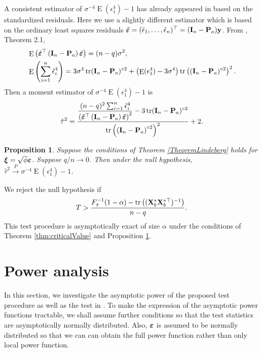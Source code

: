 \documentclass[11pt]{article}
\DeclareMathOperator{\mytr}{tr}
\DeclareMathOperator{\myE}{E}
\newcommand{\By}{\mathbf{y}}    \newcommand{\Bz}{\mathbf{z}}
\newcommand{\bfsym}[1]{\ensuremath{\boldsymbol{#1}}}
\def\bxi{\bfsym {\xi}}
\theoremstyle{plain}
\newtheorem{proposition}{\quad\quad Proposition}
\theoremstyle{definition}
\theoremstyle{remark}
\begin{document}
        A consistent estimator of $\sigma^{-4} \myE (\epsilon_1^4)-1$ has already appeared in \cite{Bai2017} based on the standardized residuals.
        Here we use a slightly different estimator which is based on the ordinary least squares residuals $\tilde \bepsilon=(\tilde \epsilon_1,\ldots, \tilde \epsilon_n)^\top=(\BI_n - \BP_a) \By$.
    From \cite{Bai2017}, Theorem 2.1, 
    \begin{align*}
        &\myE \left( \tilde \bepsilon^\top \left( \BI_n-\BP_a \right) \tilde \bepsilon \right)
        = (n-q) \sigma^2,
        \\
        &\myE \left( \sum_{i=1}^n \tilde \epsilon_i^4 \right)
        =
        3\sigma^4 \mytr (\BI_n-\BP_a)^{\circ 2} 
        +\left( \myE (\epsilon_1^4)-3 \sigma^{4}\right)
        \mytr \left( (\BI_n-\BP_a)^{\circ 2}  \right)^2.
    \end{align*}
    Then a moment estimator of $\sigma^{-4}\myE (\epsilon_1^4)-1$ is 
\begin{equation*}
    \hat \tau^2 =
    \frac{
        \displaystyle\frac{(n-q)^2 \sum_{i=1}^n \tilde{\epsilon}_i^4}{\left( \tilde \bepsilon^\top \left( \BI_n - \BP_a \right) \tilde \bepsilon \right)^2}
        - 3\mytr (\BI_n-\BP_a)^{\circ 2}
    }{
        \mytr\left( \left( \BI_n-\BP_a \right)^{\circ 2} \right)^2
    }
    +2.
\end{equation*}

\begin{proposition}\label{prop:estimation}
    Suppose the conditions of Theorem \ref{TheoremLindeberg} holds for $\bxi=\sqrt \phi \bepsilon$.
    Suppose $q/n\to 0$.
    Then under the null hypothesis, $\hat \tau^2 \xrightarrow{P} \sigma^{-4} \myE (\epsilon_1^4)-1$.
\end{proposition}
We reject the null hypothesis if 
\begin{equation*}
    T > \frac{F^{-1}_{\hat \tau} (1-\alpha)-\mytr\left( (\BX_b^* \BX_b^{*\top})^{-1}  \right)}{n-q}.
\end{equation*}
This test procedure is asymptotically exact of size $\alpha$ under the conditions of Theorem \ref{thm:criticalValue} and Proposition \ref{prop:estimation}.


\section{Power analysis}
In this section, we investigate the asymptotic power of the proposed test procedure as well as the test in \cite{Goeman2006}.
To make the expression of the asymptotic power functions tractable, we shall assume further conditions so that the test statistics are asymptotically normally distributed.
Also, $\bepsilon$ is assumed to be normally distributed so that we can can obtain the full power function rather than only local power function.
\end{document}

